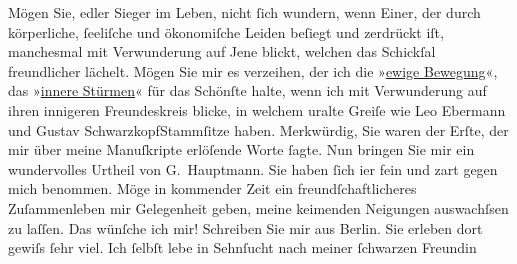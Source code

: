 \begin{ledgroupsized}[t]{13cm}
           \pstart
           Mögen Sie, edler Sieger im Leben, nicht ſich wundern, wenn Einer, der durch
               körperliche, ſeeliſche und ökonomiſche Leiden beſiegt und zerdrückt \introOben{}iſt\introOben{}, manchesmal mit Verwunderung auf Jene blickt, {\pb}welchen das Schickſal freundlicher
               lächelt. Mögen Sie mir es verzeihen, der ich die »\uline{ewige
                  Bewegung}«, das »\uline{innere Stürmen}« für das
               Schönſte halte, wenn ich mit Verwunderung auf ihren innigeren Freundeskreis blicke,
               in welchem uralte Greiſe wie Leo Ebermann und Gustav SchwarzkopfStammſitze haben.\pend
           \pstart
           Merkwürdig, Sie waren der Erſte, der mir über meine Manuſkripte erlöſende Worte
               ſagte. Nun bringen Sie mir ein wundervolles Urtheil{ }{\pb}von G. Hauptmann.\pend
           \pstart
           Sie haben ſich i{\geminationm}er fein und zart gegen mich
               benommen.\pend
           \pstart
           Möge in kommender Zeit ein freundſchaftlicheres
               Zuſammenleben mir Gelegenheit geben, meine keimenden Neigungen auswachſsen zu laſſen.
               Das wünſche ich mir!\pend
           \pstart
           Schreiben Sie mir aus Berlin. Sie erleben dort
               gewiſs ſehr viel. Ich ſelbſt lebe in Sehnſucht nach meiner ſchwarzen Freundin \label{K_L00612_1v}
\end{ledgroupsized}
